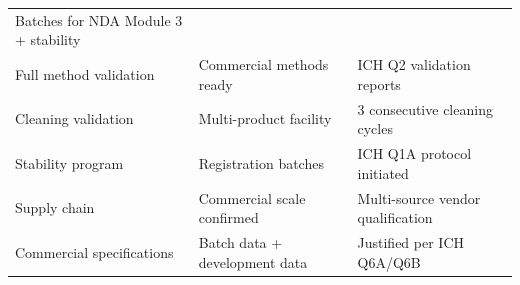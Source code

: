 \documentclass[
  11pt,
  a4paper,
]{report}
\begin{document}
\begin{longtable}[]{@{}lll@{}}
\begin{minipage}[t]{0.37\columnwidth}
Batches for NDA Module 3 + stability\strut
\end{minipage}\tabularnewline
\begin{minipage}[t]{0.29\columnwidth}\raggedright
Full method validation\strut
\end{minipage} & \begin{minipage}[t]{0.26\columnwidth}\raggedright
Commercial methods ready\strut
\end{minipage} & \begin{minipage}[t]{0.37\columnwidth}\raggedright
ICH Q2 validation reports\strut
\end{minipage}\tabularnewline
\begin{minipage}[t]{0.29\columnwidth}\raggedright
Cleaning validation\strut
\end{minipage} & \begin{minipage}[t]{0.26\columnwidth}\raggedright
Multi-product facility\strut
\end{minipage} & \begin{minipage}[t]{0.37\columnwidth}\raggedright
3 consecutive cleaning cycles\strut
\end{minipage}\tabularnewline
\begin{minipage}[t]{0.29\columnwidth}\raggedright
Stability program\strut
\end{minipage} & \begin{minipage}[t]{0.26\columnwidth}\raggedright
Registration batches\strut
\end{minipage} & \begin{minipage}[t]{0.37\columnwidth}\raggedright
ICH Q1A protocol initiated\strut
\end{minipage}\tabularnewline
\begin{minipage}[t]{0.29\columnwidth}\raggedright
Supply chain\strut
\end{minipage} & \begin{minipage}[t]{0.26\columnwidth}\raggedright
Commercial scale confirmed\strut
\end{minipage} & \begin{minipage}[t]{0.37\columnwidth}\raggedright
Multi-source vendor qualification\strut
\end{minipage}\tabularnewline
\begin{minipage}[t]{0.29\columnwidth}\raggedright
Commercial specifications\strut
\end{minipage} & \begin{minipage}[t]{0.26\columnwidth}\raggedright
Batch data + development data\strut
\end{minipage} & \begin{minipage}[t]{0.37\columnwidth}\raggedright
Justified per ICH Q6A/Q6B\strut
\end{minipage}\tabularnewline
\bottomrule
\end{longtable}
\end{document}
